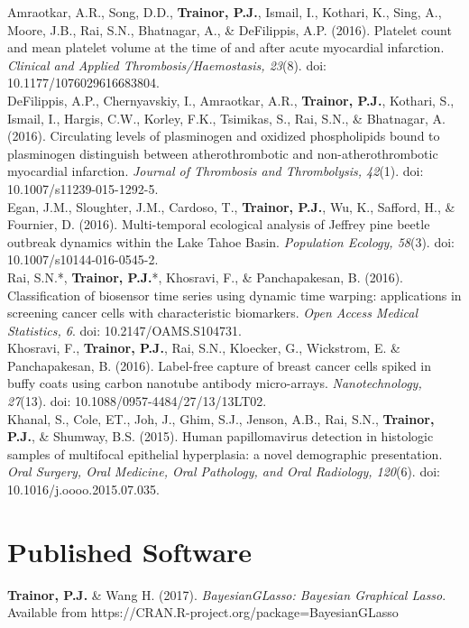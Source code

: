 {Amraotkar, A.R., Song, D.D., \textbf{Trainor, P.J.}, Ismail, I., Kothari, K., Sing, A., Moore, J.B., Rai, S.N., Bhatnagar, A., \& DeFilippis, A.P. (2016). Platelet count and mean platelet volume at the time of and after acute myocardial infarction. \emph{Clinical and Applied Thrombosis/Haemostasis, 23}(8). doi: 10.1177/1076029616683804.  \\

DeFilippis, A.P., Chernyavskiy, I., Amraotkar, A.R., \textbf{Trainor, P.J.}, 
Kothari, S., Ismail, I., Hargis, C.W., Korley, F.K., Tsimikas, S., Rai, S.N., \& Bhatnagar, A. (2016). Circulating levels of plasminogen and oxidized phospholipids bound to plasminogen distinguish between atherothrombotic and non-atherothrombotic myocardial infarction. \emph{Journal of Thrombosis and Thrombolysis, 42}(1). doi: 10.1007/s11239-015-1292-5.  \\

Egan, J.M., Sloughter, J.M., Cardoso, T., \textbf{Trainor, P.J.}, Wu, K., Safford, H., \& Fournier, D. (2016). Multi-temporal ecological analysis of Jeffrey pine beetle outbreak dynamics within the Lake Tahoe Basin. \emph{Population Ecology, 58}(3). doi: 10.1007/s10144-016-0545-2.  \\

Rai, S.N.*, \textbf{Trainor, P.J.}*, Khosravi, F., \& Panchapakesan, B.  (2016). Classification of biosensor time series using dynamic time warping: applications in screening cancer cells with characteristic biomarkers. \emph{Open Access Medical Statistics, 6}. doi: 10.2147/OAMS.S104731.  \\

Khosravi, F., \textbf{Trainor, P.J.}, Rai, S.N., Kloecker, G., Wickstrom, E. \& Panchapakesan, B. (2016). Label-free capture of breast cancer cells spiked in buffy coats using carbon nanotube antibody micro-arrays. \emph{Nanotechnology, 27}(13). doi: 10.1088/0957-4484/27/13/13LT02.  \\

Khanal, S., Cole, ET., Joh, J., Ghim, S.J., Jenson, A.B., Rai, S.N., \textbf{Trainor, P.J.}, \& Shumway, B.S. (2015). Human papillomavirus detection in histologic samples of multifocal epithelial hyperplasia: a novel demographic presentation. \emph{Oral Surgery, Oral Medicine, Oral Pathology, and Oral Radiology, 120}(6). doi: 10.1016/j.oooo.2015.07.035. 

\section*{Published Software}
\textbf{Trainor, P.J.} \& Wang H. (2017). \emph{BayesianGLasso: Bayesian Graphical Lasso}. Available from https://CRAN.R-project.org/package=BayesianGLasso

}
